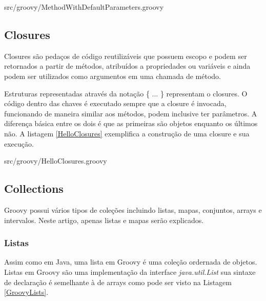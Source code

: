\documentclass[12pt]{article}
\begin{document}
    
                    {src/groovy/MethodWithDefaultParameters.groovy}

\subsection{Closures}

    Closures são pedaços de código reutilizáveis que possuem escopo e podem ser 
    retornados a partir de métodos, atribuídos a propriedades ou variáveis e 
    ainda podem ser utilizados como argumentos em uma chamada de método. 
    
    Estruturas representadas através da notação \{ ... \} representam o closures.
    O código dentro das chaves é executado sempre que a closure é invocada, 
    funcionando de maneira similar aos métodos, podem inclusive ter parâmetros. 
    A diferença básica entre os dois é que as primeiras são objetos enquanto os 
    últimos não. A listagem \ref{HelloClosures} exemplifica a construção de uma 
    closure e sua execução.
    
    
                    {src/groovy/HelloClosures.groovy}
    
\subsection{Collections}

    Groovy possui vários tipos de coleções incluindo listas, mapas, conjuntos,
    arrays e intervalos. Neste artigo, apenas listas e mapas serão explicados.
    
\subsubsection{Listas}

    Assim como em Java, uma lista em Groovy é uma coleção ordernada de objetos.
    Listas em Groovy são uma implementação da interface \emph{java.util.List} sua 
    sintaxe de declaração é semelhante à de arrays como pode ser visto na 
    Listagem \ref{GroovyLists}.
    
\end{document}
